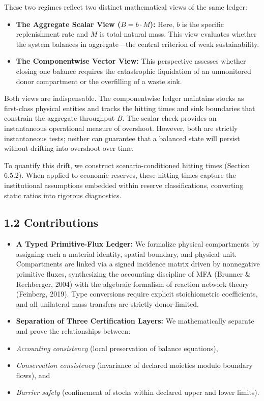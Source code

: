 \documentclass[11pt]{article}
\begin{document}
These two regimes reflect two distinct mathematical views of the same ledger:

\begin{itemize}\setlength{\itemsep}{2pt}
\item \textbf{The Aggregate Scalar View (\(B = b \cdot M\)):} Here, \(b\) is the specific replenishment rate and \(M\) is total natural mass. This view evaluates whether the system balances in aggregate---the central criterion of weak sustainability.
\item \textbf{The Componentwise Vector View:} This perspective assesses whether closing one balance requires the catastrophic liquidation of an unmonitored donor compartment or the overfilling of a waste sink.
\end{itemize}

Both views are indispensable. The componentwise ledger maintains stocks as first-class physical entities and tracks the hitting times and sink boundaries that constrain the aggregate throughput \(B\). The scalar check provides an instantaneous operational measure of overshoot. However, both are strictly instantaneous tests; neither can guarantee that a balanced state will persist without drifting into overshoot over time.

To quantify this drift, we construct scenario-conditioned hitting times (Section 6.5.2). When applied to economic reserves, these hitting times capture the institutional assumptions embedded within reserve classifications, converting static ratios into rigorous diagnostics.

\subsection*{1.2 Contributions}\label{12-contributions}

\begin{itemize}\setlength{\itemsep}{2pt}
\item \textbf{A Typed Primitive-Flux Ledger:} We formalize physical compartments by assigning each a material identity, spatial boundary, and physical unit. Compartments are linked via a signed incidence matrix driven by nonnegative primitive fluxes, synthesizing the accounting discipline of MFA (Brunner \& Rechberger, 2004) with the algebraic formalism of reaction network theory (Feinberg, 2019). Type conversions require explicit stoichiometric coefficients, and all unilateral mass transfers are strictly donor-limited.
\item \textbf{Separation of Three Certification Layers:} We mathematically separate and prove the relationships between:
\item \emph{Accounting consistency} (local preservation of balance equations),
\item \emph{Conservation consistency} (invariance of declared moieties modulo boundary flows), and
\item \emph{Barrier safety} (confinement of stocks within declared upper and lower limits).
\end{itemize}
\end{document}
